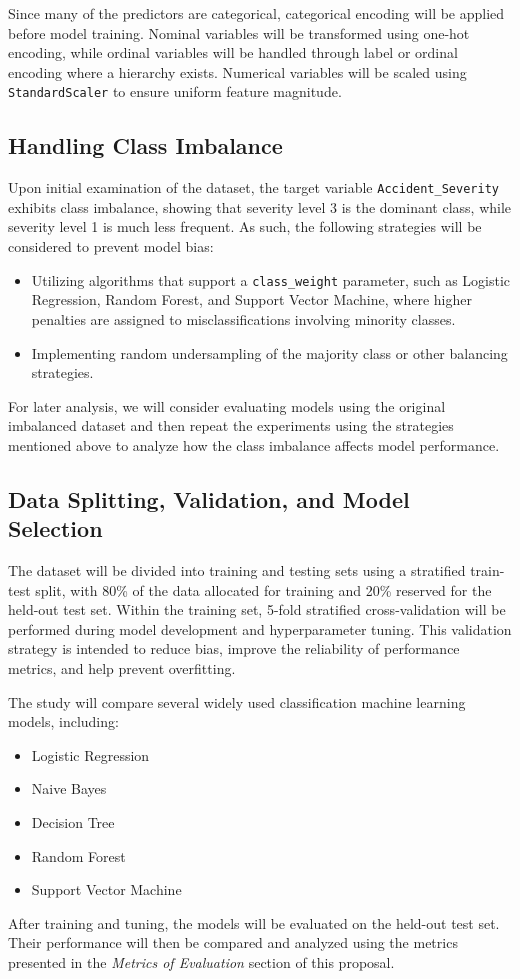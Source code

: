 Since many of the predictors are categorical, categorical encoding will be applied before model training. Nominal variables will be transformed using one-hot encoding, while ordinal variables will be handled through label or ordinal encoding where a hierarchy exists. Numerical variables will be scaled using \texttt{StandardScaler} to ensure uniform feature magnitude.

\subsection{Handling Class Imbalance}

Upon initial examination of the dataset, the target variable \texttt{Accident\_Severity} exhibits class imbalance, showing that severity level 3 is the dominant class, while severity level 1 is much less frequent. As such, the following strategies will be considered to prevent model bias:

\begin{itemize}
    \item Utilizing algorithms that support a \texttt{class\_weight} parameter, such as Logistic Regression, Random Forest, and Support Vector Machine, where higher penalties are assigned to misclassifications involving minority classes.
    \item Implementing random undersampling of the majority class or other balancing strategies.
\end{itemize}

For later analysis, we will consider evaluating models using the original imbalanced dataset and then repeat the experiments using the strategies mentioned above to analyze how the class imbalance affects model performance.

\subsection{Data Splitting, Validation, and Model Selection}

The dataset will be divided into training and testing sets using a stratified train-test split, with 80\% of the data allocated for training and 20\% reserved for the held-out test set. Within the training set, 5-fold stratified cross-validation will be performed during model development and hyperparameter tuning. This validation strategy is intended to reduce bias, improve the reliability of performance metrics, and help prevent overfitting.

The study will compare several widely used classification machine learning models, including:
\begin{itemize}
    \item Logistic Regression
    \item Naive Bayes
    \item Decision Tree
    \item Random Forest
    \item Support Vector Machine
\end{itemize}

After training and tuning, the models will be evaluated on the held-out test set. Their performance will then be compared and analyzed using the metrics presented in the \textit{Metrics of Evaluation} section of this proposal.
